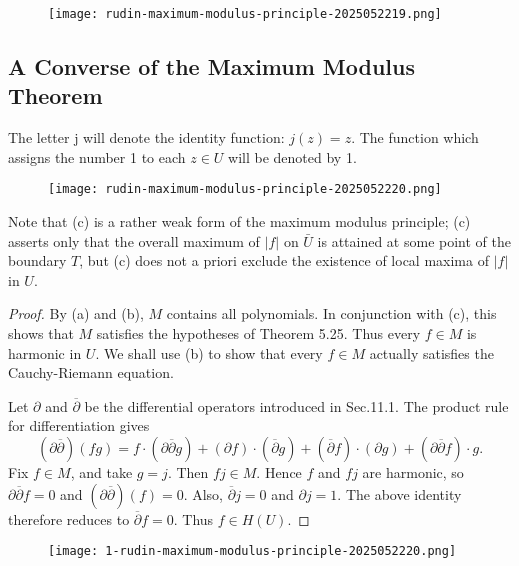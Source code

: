 \begin{figure}[H]
\centering
\texttt{[image: rudin-maximum-modulus-principle-2025052219.png]}
\label{}
\end{figure}

\subsection{A Converse of the Maximum Modulus Theorem}

The letter j will denote the identity function: $j(z) = z$. The function which assigns the number 1 to each $z \in U$ will be denoted by 1.

\begin{figure}[H]
\centering
\texttt{[image: rudin-maximum-modulus-principle-2025052220.png]}
\label{}
\end{figure}

\begin{note}
Note that (c) is a rather weak form of the maximum modulus principle; (c) asserts only that the overall maximum of $|f|$ on $\bar{U}$ is attained at some point of the boundary $T$, but (c) does not a priori exclude the existence of local maxima of $|f|$ in $U$.
\end{note}
\begin{proof}
By (a) and (b), $M$ contains all polynomials. In conjunction with (c), this shows that $M$ satisfies the hypotheses of Theorem 5.25. Thus every $f\in M$ is harmonic in $U$. We shall use (b) to show that every $f\in M$ actually satisfies the Cauchy-Riemann equation.

Let $\partial$ and $\overline{\partial}$ be the differential operators introduced in Sec.11.1. The product rule for differentiation gives
\[
(\partial\overline{\partial})(fg)=f\cdot(\partial\overline{\partial}g)+(\partial f)\cdot(\overline{\partial}g)+(\overline{\partial}f)\cdot(\partial g)+(\partial\overline{\partial}f)\cdot g.
\]
Fix $f\in M$, and take $g=j$. Then $fj\in M$. Hence $f$ and $fj$ are harmonic, so $\partial\overline{\partial}f=0$ and $(\partial\overline{\partial})(f)=0$. Also, $\overline{\partial}j=0$ and $\partial j=1$. The above identity therefore reduces to $\overline{\partial}f=0$. Thus $f\in H(U)$.
\end{proof}
\begin{figure}[H]
\centering
\texttt{[image: 1-rudin-maximum-modulus-principle-2025052220.png]}
\label{}
\end{figure}


